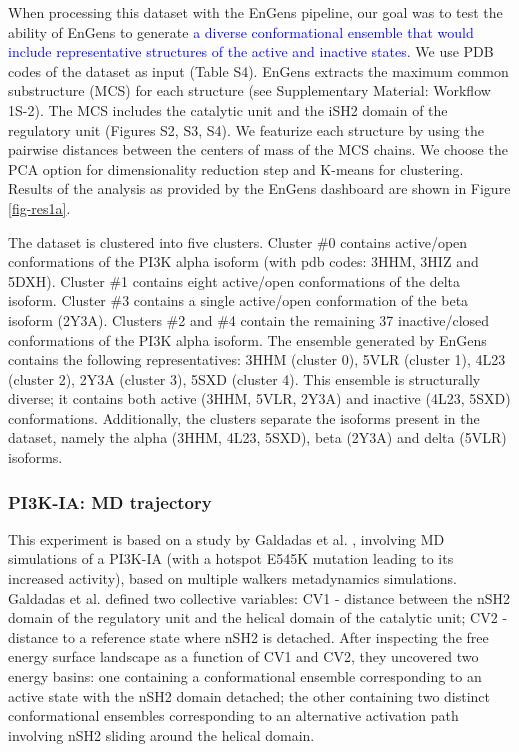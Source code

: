 \documentclass[unnumsec,webpdf,contemporary,large,numsquare]{oup-authoring-template}%
\theoremstyle{thmstyleone}%
\theoremstyle{thmstyletwo}%
\theoremstyle{thmstylethree}%
\begin{document}
When processing this dataset with the EnGens pipeline, our goal was to test the ability of EnGens to generate \textcolor{blue}{a diverse conformational ensemble that would include representative structures of the active and inactive states.} We use PDB codes of the dataset as input (Table S4). EnGens extracts the maximum common substructure (MCS) for each structure (see Supplementary Material: Workflow 1S-2). The MCS includes the catalytic unit and the iSH2 domain of the regulatory unit (Figures S2, S3, S4). We featurize each structure by using the pairwise distances between the centers of mass of the MCS chains. We choose the PCA option for dimensionality reduction step and K-means for clustering. Results of the analysis as provided by the EnGens dashboard are shown in Figure \ref{fig-res1a}. 

The dataset is clustered into five clusters. Cluster \#0 contains active/open conformations of the PI3K alpha isoform (with pdb codes: 3HHM, 3HIZ and 5DXH). Cluster \#1 contains eight active/open conformations of the delta isoform. Cluster \#3 contains a single active/open conformation of the beta isoform (2Y3A). Clusters \#2 and \#4 contain the remaining 37 inactive/closed conformations of the PI3K alpha isoform. The ensemble generated by EnGens contains the following representatives: 3HHM (cluster 0), 5VLR (cluster 1), 4L23 (cluster 2), 2Y3A (cluster 3),  5SXD (cluster 4). This ensemble is structurally diverse; it contains both active (3HHM, 5VLR, 2Y3A) and inactive (4L23, 5SXD) conformations. Additionally, the clusters separate the isoforms present in the dataset, namely the alpha (3HHM, 4L23, 5SXD), beta (2Y3A) and delta (5VLR) isoforms. 


\subsubsection{PI3K-IA: MD trajectory}


This experiment is based on a study by Galdadas et al. \citep{galdadas_unravelling_2020}, involving MD simulations of a PI3K-IA (with a hotspot E545K mutation leading to its increased activity), based on multiple walkers metadynamics simulations. Galdadas et al.  defined two collective variables: CV1 - distance between the nSH2 domain of the regulatory unit and the helical domain of the catalytic unit; CV2 - distance to a reference state where nSH2 is detached. After inspecting the free energy surface landscape as a function of CV1 and CV2, they uncovered two energy basins: one containing a conformational ensemble corresponding to an active state with the nSH2 domain detached; the other containing two distinct conformational ensembles corresponding to an alternative activation path involving nSH2 sliding around the helical domain.
\end{document}
